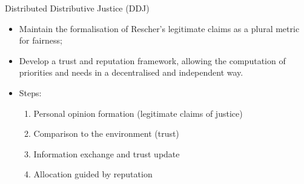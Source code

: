 \begin{frame}{Distributed Distributive Justice (DDJ)}

\begin{itemize}
\tightlist
\item
  Maintain the formalisation of Rescher's legitimate claims as a plural
  metric for fairness;
\item
  Develop a trust and reputation framework, allowing the computation of
  priorities and needs in a decentralised and independent way.
\item
  Steps:

  \begin{enumerate}
  \def\labelenumi{\arabic{enumi}.}
  \tightlist
  \item
    Personal opinion formation (legitimate claims of justice)
  \item
    Comparison to the environment (trust)
  \item
    Information exchange and trust update
  \item
    Allocation guided by reputation
  \end{enumerate}
\end{itemize}

\end{frame}

